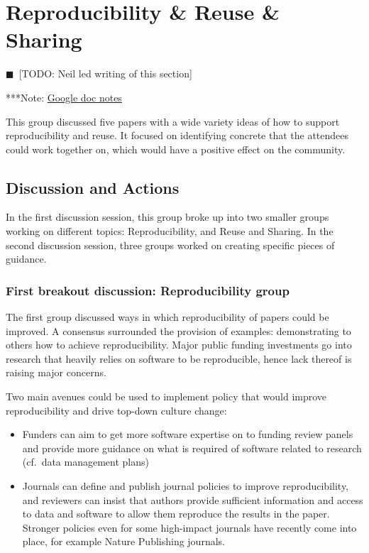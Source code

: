 \documentclass[11pt, oneside]{amsart}
\newcommand{\todo}[1]{{\color{blue}$\blacksquare$~\textsf{[TODO: #1]}}}
\newcommand{\note}[1]{ {\textcolor{blueish}    { ***Note:      #1 }}}
\begin{document}
\section{Reproducibility \& Reuse \& Sharing} \label{sec:reproduce}
\todo{Neil led writing of this section}

\note{\href{http://tinyurl.com/kqpe87z}{Google doc notes}}

This group discussed five papers with a wide variety ideas of how to support
reproducibility and reuse. It focused on identifying concrete that the attendees
could work together on, which would have a positive effect on the community.

\subsection{Discussion and Actions}

In the first discussion session, this group broke up into two smaller groups
working on different topics: Reproducibility, and Reuse and Sharing. In the
second discussion session, three groups worked on creating specific pieces of
guidance.

\subsubsection{First breakout discussion: Reproducibility group}

The first group discussed ways in which reproducibility of papers could be
improved. A consensus surrounded the provision of examples: demonstrating to
others how to achieve reproducibility. Major public funding investments go into
research that heavily relies on software to be reproducible, hence lack thereof
is raising major concerns.

Two main avenues could be used to implement policy that would improve
reproducibility and drive top-down culture change:
\begin{itemize}
\item Funders can aim to get more software expertise on to funding review panels
and provide more guidance on what is required of software related to research
(cf.\ data management plans)

\item Journals can define and publish journal policies to improve
reproducibility, and reviewers can insist that authors provide sufficient
information and access to data and software to allow them reproduce the results
in the paper. Stronger policies even for some high-impact journals have recently
come into place, for example Nature Publishing journals.
\end{itemize}
\end{document}
